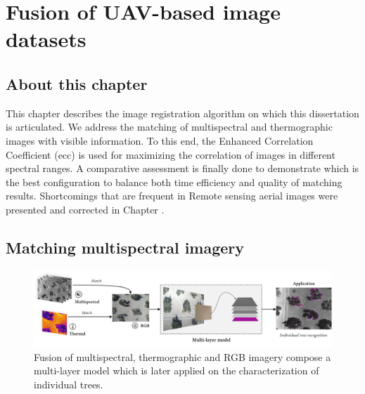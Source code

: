 \setchapterpreamble[u]{\margintoc}
\chapter{Fusion of UAV-based image datasets}
\label{sec:image_fusion}

\section*{About this chapter}

This chapter describes the image registration algorithm on which this dissertation is articulated. We address the matching of multispectral and thermographic images with visible information. To this end, the Enhanced Correlation Coefficient (\acrshort{ecc}) is used for maximizing the correlation of images in different spectral ranges. A comparative assessment is finally done to demonstrate which is the best configuration to balance both time efficiency and quality of matching results. Shortcomings that are frequent in Remote sensing aerial images were presented and corrected in Chapter . 

\section{Matching multispectral imagery}

\begin{figure}
    \includegraphics[width=\linewidth]{figs/image_fusion/summary_image_fusion.png}\hspace*{\fill}
    \caption{Fusion of multispectral, thermographic and RGB imagery compose a multi-layer model which is later applied on the characterization of individual trees.}
	\label{fig:image_fusion_framework}
\end{figure}

